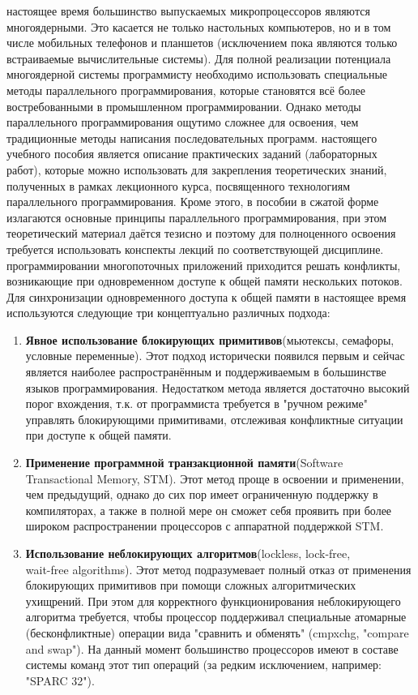 { %
	\LARGE\noindent\textbf{\space\space{}}
	\newline
	\Large{} настоящее время большинство выпускаемых микропроцессоров являются многоядерными. Это касается не только настольных компьютеров, но и в том числе мобильных телефонов и планшетов (исключением пока являются только встраиваемые вычислительные системы). Для полной реализации потенциала многоядерной системы программисту необходимо использовать специальные методы параллельного программирования, которые становятся всё более востребованными в промышленном программировании. Однако методы параллельного программирования ощутимо сложнее для освоения, чем традиционные методы написания последовательных программ.
	 настоящего учебного пособия является описание практических заданий (лабораторных работ), которые можно использовать для закрепления теоретических знаний, полученных в рамках лекционного курса, посвященного технологиям параллельного программирования. Кроме этого, в пособии в сжатой форме излагаются основные принципы параллельного программирования, при этом теоретический материал даётся тезисно и поэтому для полноценного освоения требуется использовать конспекты лекций по соответствующей дисциплине.
	 программировании многопоточных приложений приходится решать конфликты, возникающие при одновременном доступе к общей памяти нескольких потоков. Для синхронизации одновременного доступа к общей памяти в настоящее время используются следующие три концептуально различных подхода:
	\begin{enumerate}
		\item\textbf{Явное использование блокирующих примитивов}\quad(мьютексы, семафоры, условные переменные). Этот подход исторически появился первым и сейчас является наиболее распространённым и поддерживаемым в большинстве языков программирования. Недостатком метода является достаточно высокий порог вхождения, т.к. от программиста требуется в "ручном режиме" управлять блокирующими примитивами, отслеживая конфликтные ситуации при доступе к общей памяти.
		\item\textbf{Применение программной транзакционной памяти}\quad(Software\\ Transactional Memory, STM). Этот метод проще в освоении и применении, чем предыдущий, однако до сих пор имеет ограниченную поддержку в компиляторах, а также в полной мере он сможет себя проявить при более широком распространении процессоров с аппаратной поддержкой STM.
		\item\textbf{Использование неблокирующих алгоритмов}\quad(lockless, lock-free,\\wait-free algorithms). Этот метод подразумевает полный отказ от применения блокирующих примитивов при помощи сложных алгоритмических ухищрений. При этом для корректного функционирования неблокирующего алгоритма требуется, чтобы процессор поддерживал специальные атомарные (бесконфликтные) операции вида "сравнить и обменять" (cmpxchg, "compare and swap"). На данный момент большинство процессоров имеют в составе системы команд этот тип операций (за редким исключением, например: "SPARC 32").

\end{enumerate}}
